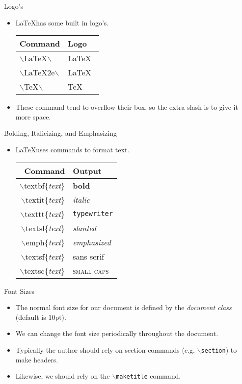 \documentclass[pdf]{prosper}
\begin{document}
\begin{slide}{Logo's}
	\begin{itemize}
		\item \LaTeX has some built in logo's.
			\begin{center}
				\begin{tabular}{|l|l|}
					\hline
					Command & Logo \\
					\hline
					$\backslash$LaTeX$\backslash$ & \LaTeX\ \\
					\hline
					$\backslash$LaTeX2e$\backslash$ & \LaTeX\ \\
					\hline
					$\backslash$TeX$\backslash$ & \TeX\ \\
					\hline
				\end{tabular}
			\end{center}
		\item These command tend to overflow their box, so the extra slash is to give it more space.
	\end{itemize}
\end{slide}
\begin{slide}{Bolding, Italicizing, and Emphasizing}
	\begin{itemize}
		\item \LaTeX uses commands to format text.
			\begin{center}
				\begin{tabular}{r l}
					\hline
					Command & Output \\
					\hline
					$\backslash$textbf\{\textit{text}\} & \textbf{bold} \\
					$\backslash$textit\{\textit{text}\} & \textit{italic} \\
					$\backslash$texttt\{\textit{text}\} & \texttt{typewriter} \\
					$\backslash$textsl\{\textit{text}\} & \textsl{slanted} \\
					$\backslash$emph\{\textit{text}\} & \emph{emphasized} \\
					$\backslash$textsf\{\textit{text}\} & \textsf{sans serif} \\
					$\backslash$textsc\{\textit{text}\} & \textsc{small caps} \\
				\end{tabular}
			\end{center}
	\end{itemize}
\end{slide}
\begin{slide}{Font Sizes}
	\begin{itemize}
		\item The normal font size for our document is defined by the \textit{document class} (default is 10pt).
		\item We can change the font size periodically throughout the document.
		\item Typically the author should rely on section commands (e.g. \texttt{$\backslash$section}) to make headers.
		\item Likewise, we should rely on the \texttt{$\backslash$maketitle} command.
	\end{itemize}
\end{slide}
\end{document}
